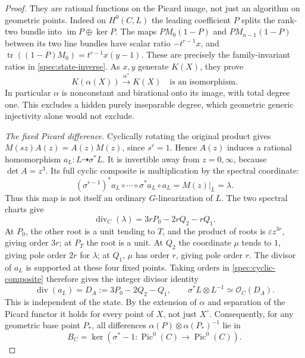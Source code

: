 \begin{proof}
They are rational functions on the Picard image, not just an
algorithm on geometric points.  Indeed on $H^0(C,L)$ the leading
coefficient $P$ splits the rank-two bundle into
$\operatorname{im}P\oplus\ker P$.
The maps $PM_0(1-P)$ and $PM_{n-1}(1-P)$ between its two line
bundles have scalar ratio $-t^{r-1}x$, and
$\operatorname{tr}((1-P)M_0)=t^{r-1}x(y-1)$.
These are precisely the family-invariant ratios in
\eqref{spec:state-inverse}.  As $x,y$ generate $K(X)$, they prove
\begin{equation}
K(\alpha(X))\xrightarrow{\alpha^*}K(X)
\quad\text{is an isomorphism}.
\label{spec:function-field-inverse}
\end{equation}
In particular $\alpha$ is nonconstant and birational onto its image,
with total degree one.  This excludes a hidden purely inseparable
degree, which geometric generic injectivity alone would not exclude.

\emph{The fixed Picard difference.}
Cyclically rotating the original product gives
$M(sz)A(z)=A(z)M(z)$, since $s^r=1$.
Hence $A(z)$ induces a rational homomorphism
$a_L:L\dashrightarrow\sigma^*L$.
It is invertible away from $z=0,\infty$, because $\det A=z^3$.
Its full cyclic composite is multiplication by the spectral
coordinate:
\begin{equation}
(\sigma^{r-1})^*a_L\circ\cdots\circ\sigma^*a_L\circ a_L
=M(z)|_L=\lambda.
\label{spec:cyclic-composite}
\end{equation}
Thus this map is not itself an ordinary $G$-linearization of $L$.
The two spectral charts give
\[
\operatorname{div}_C(\lambda)=3rP_0-2rQ_2-rQ_1.
\]
At $P_0$, the other root is a unit tending to $T$, and the product
of roots is $\varepsilon z^{3r}$, giving order $3r$; at $P_T$ the
root is a unit.  At $Q_2$ the coordinate $\mu$ tends to $1$, giving
pole order $2r$ for $\lambda$; at $Q_1$, $\mu$ has order $r$,
giving pole order $r$.  The divisor of $a_L$ is supported at these
four fixed points.  Taking orders in \eqref{spec:cyclic-composite}
therefore gives the integer divisor identity
\begin{equation}
\operatorname{div}(a_L)=D_A:=3P_0-2Q_2-Q_1,
\qquad \sigma^*L\otimes L^{-1}\simeq\mathcal O_C(D_A).
\label{spec:fixed-difference}
\end{equation}
This is independent of the state.  By the extension of $\alpha$
and separation of the Picard functor it holds for every point of
$X$, not just $X^\circ$.  Consequently, for any geometric base
point $P_*$, all differences
$\alpha(P)\otimes\alpha(P_*)^{-1}$ lie in
\[
B_C=\ker(\sigma^*-1:\operatorname{Pic}^0(C)\to
                              \operatorname{Pic}^0(C)).
\]


\end{proof}
